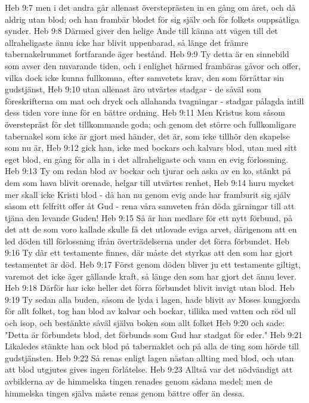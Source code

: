 Heb 9:7  men i det andra går allenast översteprästen in en gång om året, och då aldrig utan blod; och han frambär blodet för sig själv och för folkets ouppsåtliga synder.
Heb 9:8  Därmed giver den helige Ande till känna att vägen till det allraheligaste ännu icke har blivit uppenbarad, så länge det främre tabernakelrummet fortfarande äger bestånd.
Heb 9:9  Ty detta är en sinnebild som avser den nuvarande tiden, och i enlighet härmed frambäras gåvor och offer, vilka dock icke kunna fullkomna, efter samvetets krav, den som förrättar sin gudstjänst,
Heb 9:10  utan allenast äro utvärtes stadgar - de såväl som föreskrifterna om mat och dryck och allahanda tvagningar - stadgar pålagda intill dess tiden vore inne för en bättre ordning.
Heb 9:11  Men Kristus kom såsom överstepräst för det tillkommande goda; och genom det större och fullkomligare tabernakel som icke är gjort med händer, det är, som icke tillhör den skapelse som nu är,
Heb 9:12  gick han, icke med bockars och kalvars blod, utan med sitt eget blod, en gång för alla in i det allraheligaste och vann en evig förlossning.
Heb 9:13  Ty om redan blod av bockar och tjurar och aska av en ko, stänkt på dem som hava blivit orenade, helgar till utvärtes renhet,
Heb 9:14  huru mycket mer skall icke Kristi blod - då han nu genom evig ande har framburit sig själv såsom ett felfritt offer åt Gud - rena våra samveten från döda gärningar till att tjäna den levande Guden!
Heb 9:15  Så är han medlare för ett nytt förbund, på det att de som voro kallade skulle få det utlovade eviga arvet, därigenom att en led döden till förlossning ifrån överträdelserna under det förra förbundet.
Heb 9:16  Ty där ett testamente finnes, där måste det styrkas att den som har gjort testamentet är död.
Heb 9:17  Först genom döden bliver ju ett testamente giltigt, varemot det icke äger gällande kraft, så länge den som har gjort det ännu lever.
Heb 9:18  Därför har icke heller det förra förbundet blivit invigt utan blod.
Heb 9:19  Ty sedan alla buden, såsom de lyda i lagen, hade blivit av Moses kungjorda för allt folket, tog han blod av kalvar och bockar, tillika med vatten och röd ull och isop, och bestänkte såväl själva boken som allt folket
Heb 9:20  och sade: "Detta är förbundets blod, det förbunds som Gud har stadgat för eder."
Heb 9:21  Likaledes stänkte han ock blod på tabernaklet och på alla de ting som hörde till gudstjänsten.
Heb 9:22  Så renas enligt lagen nästan allting med blod, och utan att blod utgjutes gives ingen förlåtelse.
Heb 9:23  Alltså var det nödvändigt att avbilderna av de himmelska tingen renades genom sådana medel; men de himmelska tingen själva måste renas genom bättre offer än dessa.
